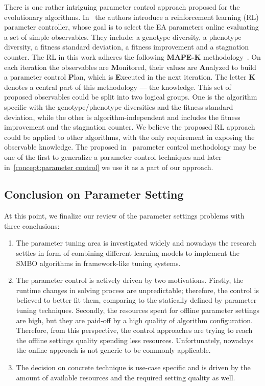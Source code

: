 There is one rather intriguing parameter control approach proposed for the evolutionary algorithms. In~\cite{karafotias2014generic} the authors introduce a reinforcement learning (RL) parameter controller, whose goal is to select the EA parameters online evaluating a set of simple observables. They include: a genotype diversity, a phenotype diversity, a fitness standard deviation, a fitness improvement and a stagnation counter.
The RL in this work adheres the following \textbf{MAPE-K} methodology~\cite{brun2009engineering}. On each iteration the observables are \textbf{M}onitored, their values are \textbf{A}nalyzed to build a parameter control \textbf{P}lan, which is \textbf{E}xecuted in the next iteration. The letter \textbf{K} denotes a central part of this methodology — the knowledge.
This set of proposed observables could be split into two logical groups. One is the algorithm specific with the genotype/phenotype diversities and the fitness standard deviation, while the other is algorithm-independent and includes the fitness improvement and the stagnation counter. We believe the proposed RL approach could be applied to other algorithms, with the only requirement in exposing the observable knowledge. The proposed in~\cite{karafotias2014generic} parameter control methodology may be one of the first to generalize a parameter control techniques and later in~\cref{concept:parameter control} we use it as a part of our approach.


\subsection{Conclusion on Parameter Setting}\label{bg: parameter setting conclution}
At this point, we finalize our review of the parameter settings problems with three conclusions:
\begin{enumerate}
	\item The parameter tuning area is investigated widely and nowadays the research settles in form of combining different learning models to implement the SMBO algorithms in framework-like tuning systems.
	
	\item The parameter control is actively driven by two motivations. Firstly, the runtime changes in solving process are unpredictable; therefore, the control is believed to better fit them, comparing to the statically defined by parameter tuning techniques. Secondly, the resources spent for offline parameter settings are high, but they are paid-off by a high quality of algorithm configuration. Therefore, from this perspective, the control approaches are trying to reach the offline settings quality spending less resources. Unfortunately, nowadays the online approach is not generic to be commonly applicable.
	
	\item The decision on concrete technique is use-case specific and is driven by the amount of available resources and the required setting quality as well.
\end{enumerate}

